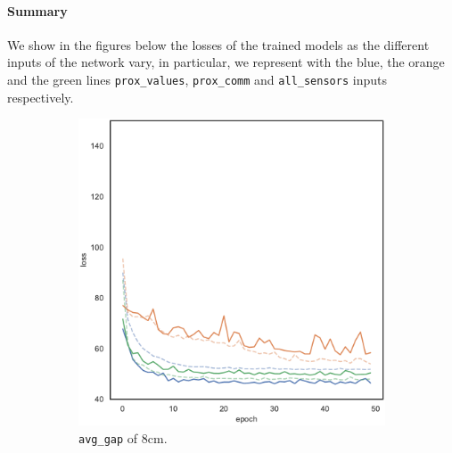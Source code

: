 \paragraph*{Summary}
We show in the figures below the losses of the trained models as the different 
inputs of the network vary, in particular, we represent with the blue, the orange 
and the green lines \texttt{prox\_values}, \texttt{prox\_comm} and
\texttt{all\_sensors} inputs respectively.
\begin{figure}[!htb]
	\centering
	\begin{subfigure}[h]{0.3\textwidth}
		\centering
		\includegraphics[width=\textwidth]{contents/images/task1/loss-distributed-gap_8@copy}%
		\caption{\texttt{avg\_gap} of $8$\gls{cm}.}
	\end{subfigure}
	\hfill
	\begin{subfigure}[h]{0.3\textwidth}
		\centering

\end{subfigure}
\end{figure}
